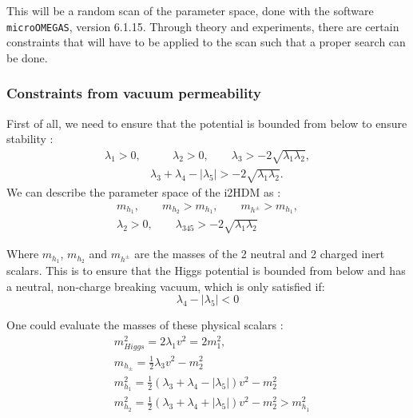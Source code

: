 \documentclass[12pt]{article}
\begin{document}
This will be a random scan of the parameter space, done with the software \verb|microOMEGAS|, version 6.1.15. Through theory and experiments, there are certain constraints that will have to be applied to the scan such that a proper search can be done.

\subsubsection{Constraints from vacuum permeability}
First of all, we need to ensure that the potential is bounded from below to ensure stability \cite{Deshpande:1977rw}:
\begin{equation}
    \begin{split}
    \lambda_1>0,& \qquad
    \lambda_2>0, \qquad
    \lambda_3> -2 \sqrt{ \lambda_1 \lambda_2}, \\
    &\lambda_3 + \lambda_4 - |\lambda_5| > -2 \sqrt{ \lambda_1 \lambda_2}.
    \end{split}
    \label{eq:potential_stability}
\end{equation}
We can describe the parameter space of the i2HDM as \cite{Belyaev:2016lok}:
\begin{equation}
    \begin{split}
        m_{h_1}, \qquad m_{h_2} > m_{h_1}, \qquad m_{h^\pm} > m_{h_1}, \\
        \lambda_2 > 0, \qquad \lambda_{345} > -2\sqrt{\lambda_1 \lambda_2}
    \end{split}
\end{equation}

Where $m_{h_1}$, $m_{h_2}$ and $m_{h^\pm}$ are the masses of the 2 neutral and 2 charged inert scalars. This is to ensure that the Higgs potential is bounded from below and has a neutral, non-charge breaking vacuum, which is only satisfied if:
\begin{equation}
    \lambda_4 - |\lambda_5| < 0
\end{equation}

One could evaluate the masses of these physical scalars \cite{Belyaev:2016lok}:
\begin{align}
    \label{eqn:scalar_equations}
    &m_{Higgs}^2 = 2\lambda_1v^2 = 2m^2_1,\\
    &m_{h_\pm} = \frac{1}{2}\lambda_3v^2-m^2_2 \\
    \label{eqn:massdmscalar}
    &m_{h_1}^2 = \frac{1}{2}(\lambda_3 + \lambda_4 - |\lambda_5|)v^2 - m_2^2\\
    &m_{h_2}^2 = \frac{1}{2}(\lambda_3 + \lambda_4 + |\lambda_5|)v^2 - m_2^2 > m^2_{h_1}
\end{align}
\end{document}
